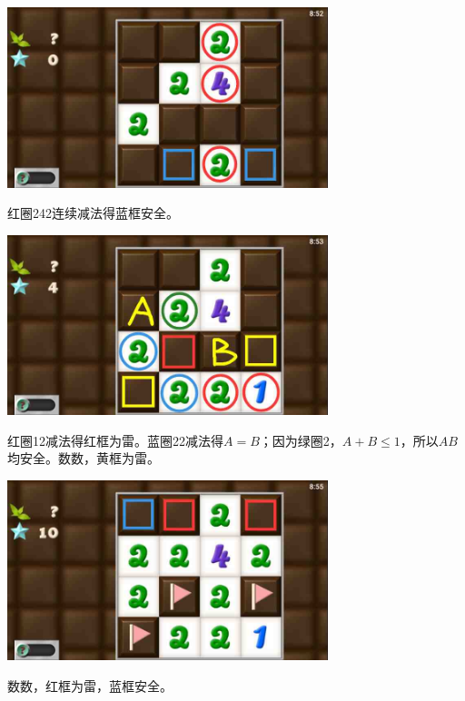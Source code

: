 \subsection{} %
\begin{center}
    \includegraphics[width=0.7\textwidth]{puzzlelow/113-1.jpg}
\end{center}
红圈242连续减法得蓝框安全。
\begin{center}
    \includegraphics[width=0.7\textwidth]{puzzlelow/113-2.jpg}
\end{center}
红圈12减法得红框为雷。蓝圈22减法得$A=B$；因为绿圈2，$A+B\le 1$，所以$AB$均安全。数数，黄框为雷。
\begin{center}
    \includegraphics[width=0.7\textwidth]{puzzlelow/113-3.jpg}
\end{center}
数数，红框为雷，蓝框安全。


